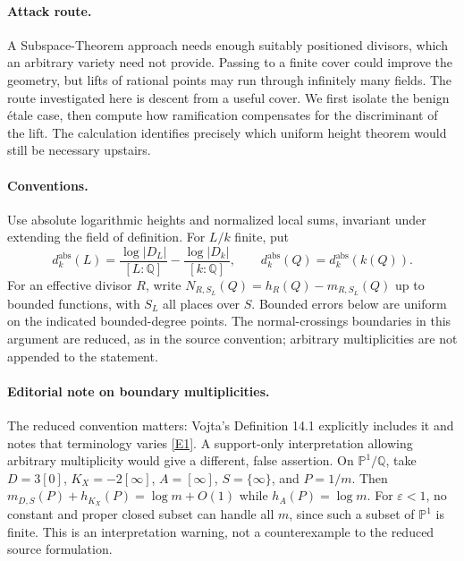 \documentclass[11pt,a4paper]{article}
\newcommand{\Q}{\mathbb{Q}}
\newcommand{\PP}{\mathbb P}
\newcommand{\eps}{\varepsilon}
\newcommand{\eref}[2]{\hyperlink{extra:#1:#2}{[E#2]}}
\numberwithin{equation}{section}
\begin{document}
\paragraph{Attack route.}
A Subspace-Theorem approach needs enough suitably positioned divisors, which an arbitrary variety need not provide. Passing to a finite cover could improve the geometry, but lifts of rational points may run through infinitely many fields. The route investigated here is descent from a useful cover. We first isolate the benign étale case, then compute how ramification compensates for the discriminant of the lift. The calculation identifies precisely which uniform height theorem would still be necessary upstairs.

\paragraph{Conventions.}
Use absolute logarithmic heights and normalized local sums, invariant under extending the field of definition. For $L/k$ finite, put
\[
 d_k^{\mathrm{abs}}(L)=\frac{\log|D_L|}{[L:\Q]}-
                          \frac{\log|D_k|}{[k:\Q]},
 \qquad d_k^{\mathrm{abs}}(Q)=d_k^{\mathrm{abs}}(k(Q)).
\]
For an effective divisor $R$, write $N_{R,S_L}(Q)=h_R(Q)-m_{R,S_L}(Q)$ up to bounded functions, with $S_L$ all places over $S$. Bounded errors below are uniform on the indicated bounded-degree points. The normal-crossings boundaries in this argument are reduced, as in the source convention; arbitrary multiplicities are not appended to the statement.

\paragraph{Editorial note on boundary multiplicities.}
The reduced convention matters: Vojta's Definition 14.1 explicitly includes it and notes that terminology varies \eref{statement}{1}. A support-only interpretation allowing arbitrary multiplicity would give a different, false assertion. On $\PP^1/\Q$, take $D=3[0]$, $K_X=-2[\infty]$, $A=[\infty]$, $S=\{\infty\}$, and $P=1/m$. Then $m_{D,S}(P)+h_{K_X}(P)=\log m+O(1)$ while $h_A(P)=\log m$. For $\eps<1$, no constant and proper closed subset can handle all $m$, since such a subset of $\PP^1$ is finite. This is an interpretation warning, not a counterexample to the reduced source formulation.
\end{document}
